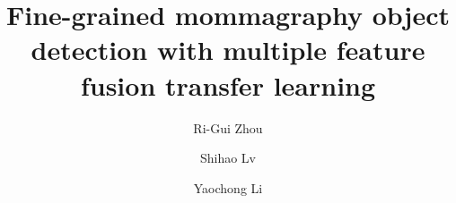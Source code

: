 \title{Fine-grained mommagraphy object 
detection with multiple feature fusion 
transfer learning}

\author[add1,add2]{Ri-Gui Zhou}

\author[add1,add2]{Shihao Lv}


\author[add1,add2]{Yaochong Li}

\address[add1]{College of Information 
Engineering, Shanghai Maritime University, 
Shanghai 201306, China}
\address[add2]{Research Center of 
Intelligent Information Processing and 
Quantum Intelligent Computing, Shanghai 
201306, China}